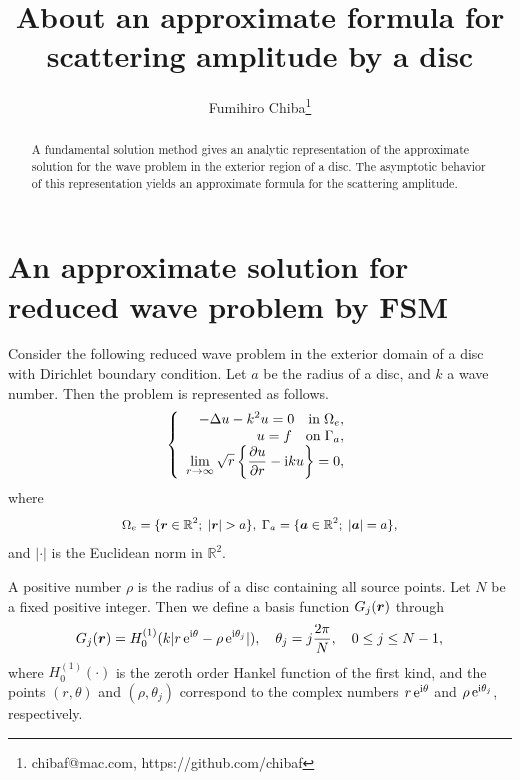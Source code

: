\documentclass[12pt]{article}
\newcommand*{\Rset}{\mathbb{R}}
\def\e{ \,{\rm e}}
\def\bfvec#1{\mbox{\boldmath$#1$}}
\begin{document}
\title{About an approximate formula for scattering amplitude by a disc}
\author{Fumihiro Chiba\thanks{chibaf@mac.com, https://github.com/chibaf}}
\maketitle

\begin{abstract}
A fundamental solution method gives an analytic representation of the approximate solution for the wave problem in the exterior region of a disc. The asymptotic behavior of this representation yields an approximate formula for the scattering amplitude.
\end{abstract}

\section{An approximate solution for reduced wave problem by FSM}
Consider the following reduced wave problem in the exterior domain of a disc with Dirichlet boundary condition. Let $a$ be the radius of a disc, and $k$ a wave number. Then the problem is represented as follows.
\begin{eqnarray*}
\left\{
\begin{array}{r}
\displaystyle -\Delta u -k^2 u = 0 \quad {\rm in} \; \Omega_e,\\
\displaystyle u=f \quad {\rm on} \; \Gamma_a, \\
\displaystyle \lim_{r \rightarrow \infty} \sqrt{r} \left\{\frac{\partial u}{\partial r}- \mathrm{i} k u \right\}=0,
\end{array}
\right.
\end{eqnarray*}
where
\begin{eqnarray*}
{\small \Omega_e=\{\bfvec{r}\in\Rset^2;\;|\bfvec{r}|>a\}, \; \Gamma_a=\{\bfvec{a}\in\Rset^2;\; |\bfvec{a}|=a\},}
\end{eqnarray*}
and $|\cdot|$ is the Euclidean norm in $\Rset^2$.


A positive number $\rho$ is the radius of a disc containing all source points. Let $N$ be a fixed positive integer. Then we define a basis function $G_j(\bfvec{r})$ through
\begin{displaymath}
G_j({\bfvec{r}}) = H_0^{(1)}(k|r\e^{\mathrm{i}\theta}- \rho \e^{\mathrm{i}{\theta}_j}|),
\quad \theta_j=j\frac{2\pi}{N},\quad 0 \leq j \leq N-1,
\end{displaymath}
where $H_0^{(1)}(\cdot)$ is the zeroth order Hankel function of the first kind, and the points $(r,\theta)$ and $(\rho,\theta_j)$ correspond to the complex numbers $r\e^{\mathrm{i}\theta}$ and $\rho \e^{\mathrm{i}{\theta}_j}$, respectively.
\end{document}
